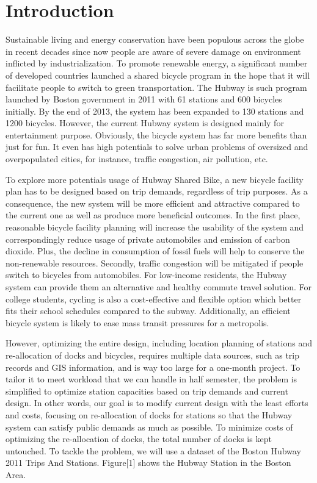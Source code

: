 \documentclass[journal, letterpaper]{IEEEtran}
\begin{document}
\section{Introduction}
\large
Sustainable living and energy conservation have been populous across the globe in recent decades since now people are aware of severe damage on environment inflicted by industrialization. To promote renewable energy, a significant number of developed countries launched a shared bicycle program in the hope that it will facilitate people to switch to green transportation. The Hubway is such program launched by Boston government in 2011 with 61 stations and 600 bicycles initially. By the end of 2013, the system has been expanded to 130 stations and 1200 bicycles. However, the current Hubway system is designed mainly for entertainment purpose. Obviously, the bicycle system has far more benefits than just for fun. It even has high potentials to solve urban problems of oversized and overpopulated cities, for instance, traffic congestion, air pollution, etc. 

To explore more potentials usage of Hubway Shared Bike, a new bicycle facility plan has to be designed based on trip demands, regardless of trip purposes. As a consequence, the new system will be more efficient and attractive compared to the current one as well as produce more beneficial outcomes. In the first place, reasonable bicycle facility planning will increase the usability of the system and correspondingly reduce usage of private automobiles and emission of carbon dioxide. Plus, the decline in consumption of fossil fuels will help to conserve the non-renewable resources. Secondly, traffic congestion will be mitigated if people switch to bicycles from automobiles. For low-income residents, the Hubway system can provide them an alternative and healthy commute travel solution. For college students, cycling is also a cost-effective and flexible option which better fits their school schedules compared to the subway. Additionally, an efficient bicycle system is likely to ease mass transit pressures for a metropolis.  

However, optimizing the entire design, including location planning of stations and re-allocation of docks and bicycles, requires multiple data sources, such as trip records and GIS information, and is way too large for a one-month project. To tailor it to meet workload that we can handle in half semester, the problem is simplified to optimize station capacities based on trip demands and current design. In other words, our goal is to modify current design with the least efforts and costs, focusing on re-allocation of docks for stations so that the Hubway system can satisfy public demands as much as possible. To minimize costs of optimizing the re-allocation of docks, the total number of docks is kept untouched. To tackle the problem, we will use a dataset of the Boston Hubway 2011 Trips And Stations.  Figure[1] shows the Hubway Station in the Boston Area. 
\end{document}

